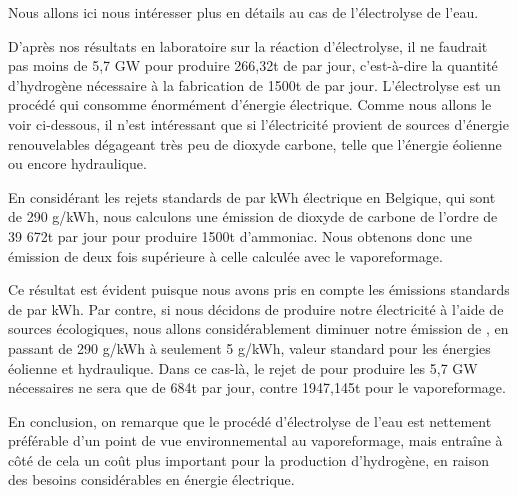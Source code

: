 \documentclass[a4paper, oneside, 12pt]{article}
\begin{document}
Nous allons ici nous intéresser plus en détails au cas de l'électrolyse de l'eau. 

D'après nos résultats en laboratoire sur la réaction d'électrolyse, il ne faudrait pas moins de 5,7 GW pour produire 266,32t de  par jour, c'est-à-dire la quantité d'hydrogène nécessaire à la fabrication de 1500t de  par jour. L'électrolyse est un procédé qui consomme énormément d'énergie électrique. Comme nous allons le voir ci-dessous, il n'est intéressant que si l'électricité provient de sources d'énergie renouvelables dégageant très peu de dioxyde carbone, telle que l'énergie éolienne ou encore hydraulique.

En considérant les rejets standards de  par kWh électrique en Belgique, qui sont de 290 g/kWh, nous calculons une émission de dioxyde de carbone de l'ordre de 39 672t par jour pour produire 1500t d'ammoniac. Nous obtenons donc une émission de  deux fois supérieure à celle calculée avec le vaporeformage.

Ce résultat est évident puisque nous avons pris en compte les émissions standards de  par kWh.
Par contre, si nous décidons de produire notre électricité à l'aide de sources écologiques, nous allons considérablement diminuer notre émission de , en passant de 290
g/kWh à seulement 5 g/kWh, valeur standard pour les énergies éolienne et hydraulique. Dans ce cas-là, le rejet de  pour produire les 5,7 GW nécessaires ne sera que de 684t par jour, contre 1947,145t pour le vaporeformage. 
\newline

En conclusion, on remarque que le procédé d'électrolyse de l'eau est nettement préférable d'un point de vue environnemental au vaporeformage, mais entraîne à côté de cela un coût plus important pour la production d'hydrogène, en raison des besoins considérables en énergie électrique.
\end{document}
